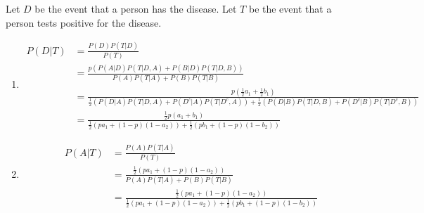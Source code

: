 Let $D$ be the event that a person has the disease. Let $T$ be the event
that a person tests positive for the disease.

\begin{enumerate}[label=(\alph*)]
\item 
\begin{align*}
P(D|T) &= \frac{P(D)P(T|D)}{P(T)} \\
&= \frac{p(P(A|D)P(T|D, A) + P(B|D)P(T|D, B))}{P(A)P(T|A) + P(B)P(T|B)} \\
&= \frac{p\left(\frac{1}{2}a_{1} + \frac{1}{2}b_{1}\right)}{\frac{1}{2}\left
(P(D|A)P(T|D, A) + P(D^{c}|A)P(T|D^{c}, A)\right) + \frac{1}{2}\left(P
(D|B)P(T|D, B) + P(D^{c}|B)P(T|D^{c}, B)\right)} \\
&= \frac{\frac{1}{2}p(a_{1} + b_{1})}{\frac{1}{2}(pa_{1} + (1-p)(1-a_{2})) +
\frac{1}{2}(pb_{1} + (1-p)(1-b_{2}))}
\end{align*}

\item
\begin{align*}
P(A|T) &= \frac{P(A)P(T|A)}{P(T)} \\
&= \frac{\frac{1}{2}(pa_{1} + (1-p)(1-a_{2}))}{P(A)P(T|A) + P(B)P(T|B)} \\
&= \frac{\frac{1}{2}(pa_{1} + (1-p)(1-a_{2}))}{\frac{1}{2}(pa_{1} + (1-p)(1-a_
{2})) + \frac{1}{2}(pb_{1} + (1-p)(1-b_{2}))}
\end{align*}
\end{enumerate}
